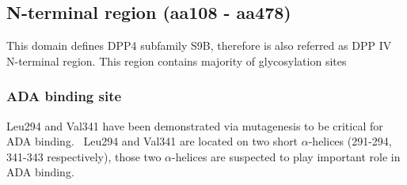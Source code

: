 \subsection{N-terminal region (aa108 - aa478)}

This domain defines DPP4 subfamily S9B, therefore is also referred as DPP IV N-terminal region. This region contains majority of  glycosylation sites 

\subsubsection{ADA binding site}
Leu294 and Val341 have been demonstrated via mutagenesis to be critical for ADA binding.~\cite{Abbott_1999} Leu294 and Val341 are located on two short $\alpha$-helices (291-294, 341-343 respectively), those two $\alpha$-helices are suspected to play important role in ADA binding. 